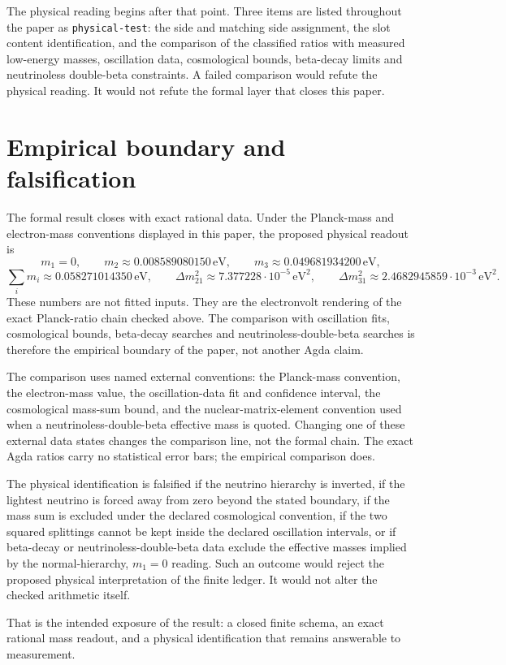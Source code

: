 \documentclass[11pt]{article}
\begin{document}
The physical reading begins after that point.  Three items are listed
throughout the paper as \texttt{physical-test}: the side and matching
side assignment, the slot content identification, and the comparison
of the classified ratios with measured low-energy masses, oscillation
data, cosmological bounds, beta-decay limits and neutrinoless
double-beta constraints.  A failed comparison would refute the
physical reading.  It would not refute the formal layer that closes
this paper.

\section*{Empirical boundary and falsification}

The formal result closes with exact rational data.  Under the Planck-mass
and electron-mass conventions displayed in this paper, the proposed physical
readout is
\[
  m_1=0,
  \qquad m_2\approx0.008589080150\,\mathrm{eV},
  \qquad m_3\approx0.049681934200\,\mathrm{eV},
\]
\[
  \sum_i m_i\approx0.058271014350\,\mathrm{eV},
  \qquad
  \Delta m^2_{21}\approx7.377228\cdot10^{-5}\,\mathrm{eV}^2,
  \qquad
  \Delta m^2_{31}\approx2.4682945859\cdot10^{-3}\,\mathrm{eV}^2.
\]
These numbers are not fitted inputs.  They are the electronvolt rendering of
the exact Planck-ratio chain checked above.  The comparison with oscillation
fits, cosmological bounds, beta-decay searches and neutrinoless-double-beta
searches is therefore the empirical boundary of the paper, not another Agda
claim.

The comparison uses named external conventions: the Planck-mass convention,
the electron-mass value, the oscillation-data fit and confidence interval,
the cosmological mass-sum bound, and the nuclear-matrix-element convention
used when a neutrinoless-double-beta effective mass is quoted.  Changing one
of these external data states changes the comparison line, not the formal
chain.  The exact Agda ratios carry no statistical error bars; the empirical
comparison does.

The physical identification is falsified if the neutrino hierarchy is
inverted, if the lightest neutrino is forced away from zero beyond the stated
boundary, if the mass sum is excluded under the declared cosmological
convention, if the two squared splittings cannot be kept inside the declared
oscillation intervals, or if beta-decay or neutrinoless-double-beta data
exclude the effective masses implied by the normal-hierarchy, $m_1=0$
reading.  Such an outcome would reject the proposed physical interpretation
of the finite ledger.  It would not alter the checked arithmetic itself.

That is the intended exposure of the result: a closed finite schema, an exact
rational mass readout, and a physical identification that remains answerable
to measurement.
\end{document}
